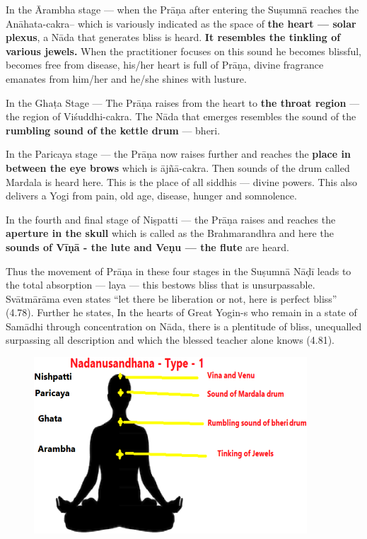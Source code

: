 In the Ārambha stage --- when the Prāṇa after entering the Suṣumnā reaches the Anāhata-cakra– which is variously indicated as the space of \textbf{the heart --- solar plexus}, a Nāda that generates bliss is heard. \textbf{It resembles the tinkling of various jewels.} When the practitioner focuses on this sound he becomes blissful, becomes free from disease, his/her heart is full of Prāṇa, divine fragrance emanates from him/her and he/she shines with lusture. 

In the Ghaṭa Stage --- The Prāṇa raises from the heart to \textbf{the throat region} --- the region of Viśuddhi-cakra. The Nāda that emerges resembles the sound of the \textbf{rumbling sound of the kettle drum} --- bheri.

In the Paricaya stage --- the Prāṇa now raises further and reaches the \textbf{place in between the eye brows} which is ājñā-cakra.  Then sounds of the drum called Mardala is heard here. This is the place of all siddhis --- divine powers. This also delivers a Yogi from pain, old age, disease, hunger and somnolence.
 
In the fourth and final stage of Niṣpatti --- the Prāṇa raises and reaches the \textbf{aperture in the skull} which is called as the Brahmarandhra and here the \textbf{sounds of Vīṇā - the lute and Veṇu --- the flute} are heard. 

Thus the movement of Prāṇa in these four stages in the Suṣumnā Nāḍī leads to the total absorption --- laya --- this bestows bliss that is unsurpassable. Svātmārāma even states “let there be liberation or not, here is perfect bliss” (4.78). Further he states, In the hearts of Great Yogin-s who remain in a state of Samādhi through concentration on Nāda, there is a plentitude of bliss, unequalled surpassing all description and which the blessed teacher alone knows (4.81). 

\begin{figure}
\centering
\includegraphics[scale=.8]{images/fig1.png}
\end{figure}

